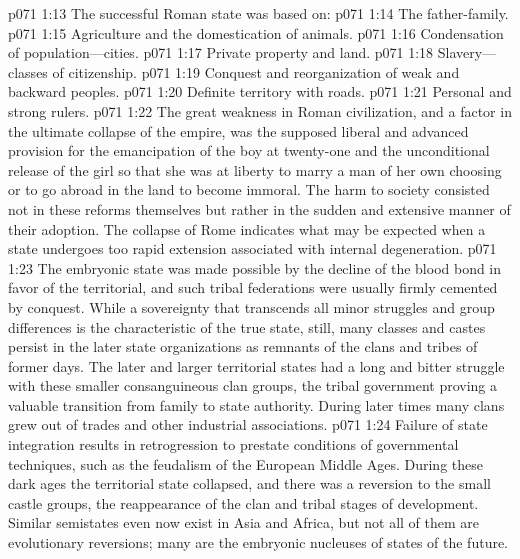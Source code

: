 \pc \vs p071 1:13 The successful Roman state was based on:
\pc \vs p071 1:14 \bibnobreakspace The father\hyp{}family.
\vs p071 1:15 \bibnobreakspace Agriculture and the domestication of animals.
\vs p071 1:16 \bibnobreakspace Condensation of population---cities.
\vs p071 1:17 \bibnobreakspace Private property and land.
\vs p071 1:18 \bibnobreakspace Slavery---classes of citizenship.
\vs p071 1:19 \bibnobreakspace Conquest and reorganization of weak and backward peoples.
\vs p071 1:20 \bibnobreakspace Definite territory with roads.
\vs p071 1:21 \bibnobreakspace Personal and strong rulers.
\pc \vs p071 1:22 The great weakness in Roman civilization, and a factor in the ultimate collapse of the empire, was the supposed liberal and advanced provision for the emancipation of the boy at twenty\hyp{}one and the unconditional release of the girl so that she was at liberty to marry a man of her own choosing or to go abroad in the land to become immoral. The harm to society consisted not in these reforms themselves but rather in the sudden and extensive manner of their adoption. The collapse of Rome indicates what may be expected when a state undergoes too rapid extension associated with internal degeneration.
\pc \vs p071 1:23 The embryonic state was made possible by the decline of the blood bond in favor of the territorial, and such tribal federations were usually firmly cemented by conquest. While a sovereignty that transcends all minor struggles and group differences is the characteristic of the true state, still, many classes and castes persist in the later state organizations as remnants of the clans and tribes of former days. The later and larger territorial states had a long and bitter struggle with these smaller consanguineous clan groups, the tribal government proving a valuable transition from family to state authority. During later times many clans grew out of trades and other industrial associations.
\vs p071 1:24 Failure of state integration results in retrogression to prestate conditions of governmental techniques, such as the feudalism of the European Middle Ages. During these dark ages the territorial state collapsed, and there was a reversion to the small castle groups, the reappearance of the clan and tribal stages of development. Similar semistates even now exist in Asia and Africa, but not all of them are evolutionary reversions; many are the embryonic nucleuses of states of the future.\plusone
{}
